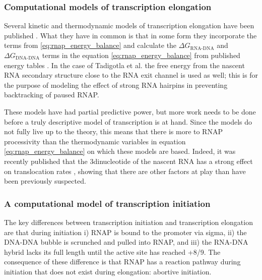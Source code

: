 \subsubsection{Computational models of transcription elongation}
Several kinetic and thermodynamic models of transcription elongation have been
published \cite{tadigotla_thermodynamic_2006-1, bai_sequence-dependent_2004,
guajardo_model_1997}. What they have in common is that in some form they
incorporate the terms from \eqref{eq:rnap_energy_balance} and calculate the
$\Delta G_{\text{RNA-DNA}}$ and $\Delta G_{\text{DNA-DNA}}$ terms in the
equation \eqref{eq:rnap_energy_balance} from published energy tables
\cite{wu_temperature_2002, santalucia_thermodynamics_2004}. In the case of
Tadigotla et al. \cite{tadigotla_thermodynamic_2006-1} the free energy from the
nascent RNA secondary structure close to the RNA exit channel is used as well;
this is for the purpose of modeling the effect of strong RNA hairpins in
preventing backtracking of paused RNAP.

These models have had partial predictive power, but more work needs to be done
before a truly descriptive model of transcription is at hand. Since the models
do not fully live up to the theory, this means that there is more to RNAP
processivity than the thermodynamic variables in equation
\eqref{eq:rnap_energy_balance} on which these models are based. Indeed, it was
recently published that the 3\p dinucleotide of the nascent RNA has a strong
effect on translocation rates \cite{hein_rna_2011}, showing that there are
other factors at play than have been previously suspected.

\subsubsection{A computational model of transcription initiation}
The key differences between transcription initiation and transcription
elongation are that during initiation i) RNAP is bound to the promoter via
sigma, ii) the DNA-DNA bubble is scrunched and pulled into RNAP, and iii) the
RNA-DNA hybrid lacks its full length until the active site has reached +8/9.
The consequence of these difference is that RNAP has a reaction pathway during
initiation that does not exist during elongation: abortive initiation.


